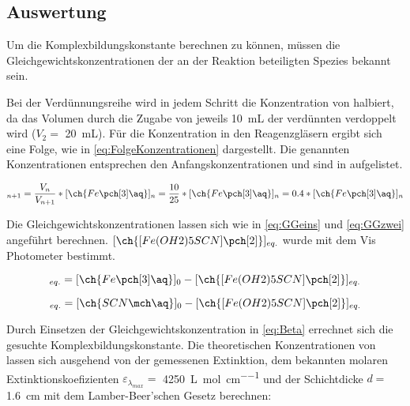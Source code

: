 \documentclass{article}
\begin{document}
    \subsection{Auswertung}
    
      Um die Komplexbildungskonstante berechnen zu können, müssen die Gleichgewichtskonzentrationen der an der Reaktion beteiligten Spezies bekannt sein. 
      
      Bei der Verdünnungsreihe wird in jedem Schritt die Konzentration von   halbiert, da das Volumen durch die Zugabe von jeweils \SI[mode=text]{10}{\milli\liter} der verdünnten  verdoppelt wird ($V_{2} =$ \SI[mode=text]{20}{\milli\liter}). Für die  Konzentration in den Reagenzgläsern ergibt sich eine Folge, wie in \eqref{eq:FolgeKonzentrationen} dargestellt. Die genannten Konzentrationen entsprechen den Anfangskonzentrationen und sind in aufgelistet. 
    
      \begin{equation}
        [\ch{Fe\pch[3]\aq}]_{n+1} = \frac{V_{n}}{V_{n+1}} * [\ch{Fe\pch[3]\aq}]_{n} = \frac{10}{25} * [\ch{Fe\pch[3]\aq}]_{n} = 0.4 * [\ch{Fe\pch[3]\aq}]_{n}\label{eq:FolgeKonzentrationen}
      \end{equation}
    
      Die Gleichgewichtskonzentrationen lassen sich wie in \eqref{eq:GGeins} und \eqref{eq:GGzwei} angeführt berechnen. $[\ch{[Fe(OH2)5SCN]\pch[2]}]_{eq.}$ wurde mit dem Vis Photometer bestimmt.
      
      \begin{equation}
        [\ch{Fe\pch[3]\aq}]_{eq.} = [\ch{Fe\pch[3]\aq}]_{0} - [\ch{[Fe(OH2)5SCN]\pch[2]}]_{eq.} \label{eq:GGeins}
      \end{equation}
      
      \begin{equation}
        [\ch{SCN\mch\aq}]_{eq.} = [\ch{SCN\mch\aq}]_{0} - [\ch{[Fe(OH2)5SCN]\pch[2]}]_{eq.} \label{eq:GGzwei}
      \end{equation}
      
      Durch Einsetzen der Gleichgewichtskonzentration in \eqref{eq:Beta} errechnet sich die gesuchte Komplexbildungskonstante. Die theoretischen Konzentrationen von \ch{[Fe(OH2)5SCN]\pch[2]} lassen sich ausgehend von der gemessenen Extinktion, dem bekannten molaren Extinktionskoefizienten $\varepsilon_{\lambda_{max}} =$ \SI[mode=text]{4250}{\liter\per\mole\per\centi\meter} und der Schichtdicke $d =$ \SI[mode=text]{1.6}{\centi\meter} mit dem Lamber-Beer'schen Gesetz berechnen:
      
\end{document}
